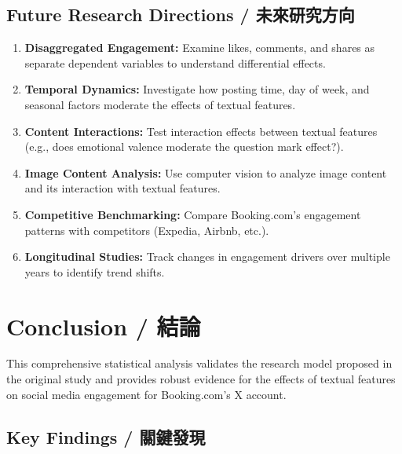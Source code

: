 \documentclass[12pt,a4paper,fontset=none]{ctexart}
\begin{document}
\subsection{Future Research Directions / 未來研究方向}

\begin{enumerate}
    \item \textbf{Disaggregated Engagement:} Examine likes, comments, and shares as separate dependent variables to understand differential effects.

    \item \textbf{Temporal Dynamics:} Investigate how posting time, day of week, and seasonal factors moderate the effects of textual features.

    \item \textbf{Content Interactions:} Test interaction effects between textual features (e.g., does emotional valence moderate the question mark effect?).

    \item \textbf{Image Content Analysis:} Use computer vision to analyze image content and its interaction with textual features.

    \item \textbf{Competitive Benchmarking:} Compare Booking.com's engagement patterns with competitors (Expedia, Airbnb, etc.).

    \item \textbf{Longitudinal Studies:} Track changes in engagement drivers over multiple years to identify trend shifts.
\end{enumerate}

\newpage

\section{Conclusion / 結論}

This comprehensive statistical analysis validates the research model proposed in the original study and provides robust evidence for the effects of textual features on social media engagement for Booking.com's X account.

\subsection{Key Findings / 關鍵發現}
\end{document}
